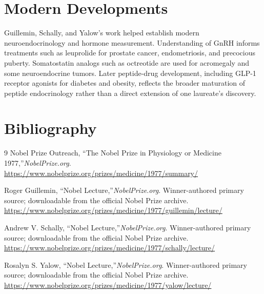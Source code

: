 \section{Modern Developments}

Guillemin, Schally, and Yalow's work helped establish modern neuroendocrinology and hormone measurement. Understanding of GnRH informs treatments such as leuprolide for prostate cancer, endometriosis, and precocious puberty. Somatostatin analogs such as octreotide are used for acromegaly and some neuroendocrine tumors. Later peptide-drug development, including GLP-1 receptor agonists for diabetes and obesity, reflects the broader maturation of peptide endocrinology rather than a direct extension of one laureate's discovery.


\section{Bibliography}

\begin{thebibliography}{9}
Nobel Prize Outreach, ``The Nobel Prize in Physiology or Medicine 1977,''\emph{NobelPrize.org}.\\
\url{https://www.nobelprize.org/prizes/medicine/1977/summary/}

Roger Guillemin, ``Nobel Lecture,''\emph{NobelPrize.org}. Winner-authored primary source; downloadable from the official Nobel Prize archive.\\
\url{https://www.nobelprize.org/prizes/medicine/1977/guillemin/lecture/}

Andrew V. Schally, ``Nobel Lecture,''\emph{NobelPrize.org}. Winner-authored primary source; downloadable from the official Nobel Prize archive.\\
\url{https://www.nobelprize.org/prizes/medicine/1977/schally/lecture/}

Rosalyn S. Yalow, ``Nobel Lecture,''\emph{NobelPrize.org}. Winner-authored primary source; downloadable from the official Nobel Prize archive.\\
\url{https://www.nobelprize.org/prizes/medicine/1977/yalow/lecture/}
\end{thebibliography}

